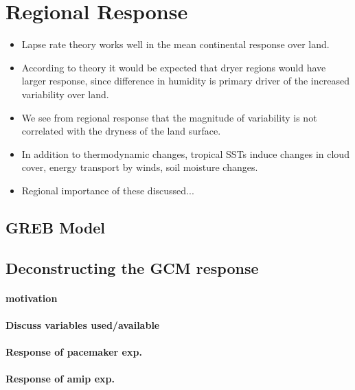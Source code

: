 
\section{Regional Response}

\begin{itemize}
	\item Lapse rate theory works well in the mean continental response over 
		land.
	\item According to theory it would be expected that dryer regions would have 
		larger response, since difference in humidity is primary driver of the 
		increased variability over land.
	\item We see from regional response that the magnitude of variability is not 
		correlated with the dryness of the land surface.
	\item In addition to thermodynamic changes, tropical SSTs induce changes in 
		cloud cover, energy transport by winds, soil moisture changes.
	\item Regional importance of these discussed...
\end{itemize}


\subsection{GREB Model}

\subsection{Deconstructing the GCM response}
\paragraph{motivation}
\paragraph{Discuss variables used/available}
\paragraph{Response of pacemaker exp.}
\paragraph{Response of amip exp.}


